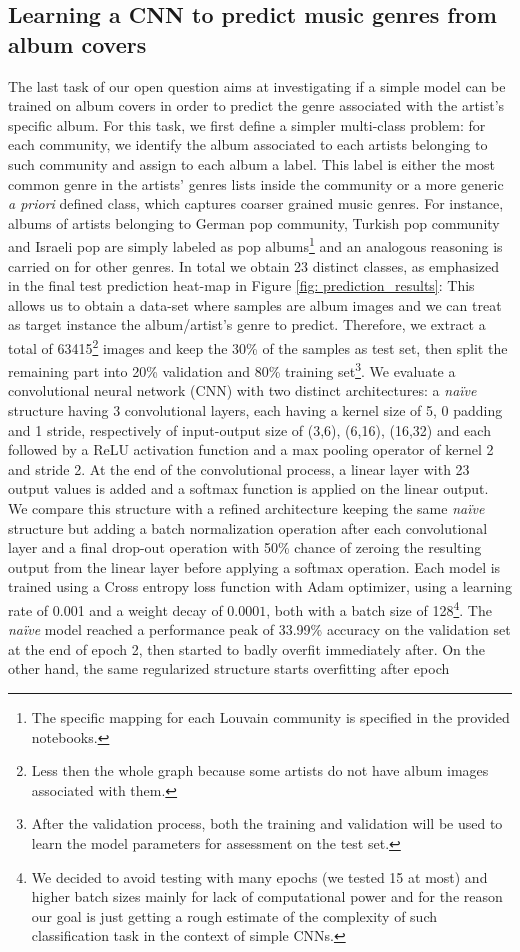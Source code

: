 \documentclass[sigchi]{acmart}
\begin{document}
\subsection{Learning a CNN to predict music genres from album covers}
The last task of our open question aims at investigating if a simple model can be trained on album covers in order to predict the genre associated with the artist's specific album. For this task, we first define a simpler multi-class problem: for each community, we identify the album associated to each artists belonging to such community and assign to each album a label. This label is either the most common genre in the artists' genres lists inside the community or a more generic \textit{a priori} defined class, which captures coarser grained music genres. For instance, albums of artists belonging to German pop community, Turkish pop community and Israeli pop are simply labeled as pop albums\footnote{The specific mapping for each Louvain community is specified in the provided notebooks.} and an analogous reasoning is carried on for other genres. In total we obtain 23 distinct classes, as emphasized in the final test prediction heat-map in Figure \ref{fig: prediction_results}: This allows us to obtain a data-set where samples are album images and we can treat as target instance the album/artist's genre to predict. Therefore, we extract a total of 63415\footnote{Less then the whole graph because some artists do not have album images associated with them.} images and keep the 30\% of the samples as test set, then split the remaining part into 20\% validation and 80\% training set\footnote{After the validation process, both the training and validation will be used to learn the model parameters for assessment on the test set.}. We evaluate a convolutional neural network (CNN) with two distinct architectures: a \textit{naïve} structure having 3 convolutional layers, each having a kernel size of 5, 0 padding and 1 stride, respectively of input-output size of (3,6), (6,16), (16,32) and each followed by a ReLU activation function and a max pooling operator of kernel 2 and stride 2. At the end of the convolutional process, a linear layer with 23 output values is added and a softmax function is applied on the linear output. We compare this structure with a refined architecture keeping the same \textit{naïve} structure but adding a batch normalization operation after each convolutional layer and a final drop-out operation with 50\% chance of zeroing the resulting output from the linear layer before applying a softmax operation. Each model is trained using a Cross entropy loss function with Adam optimizer, using a learning rate of 0.001 and a weight decay of $0.0001$, both with a batch size of 128\footnote{We decided to avoid testing with many epochs (we tested 15 at most) and higher batch sizes mainly for lack of computational power and for the reason our goal is just getting a rough estimate of the complexity of such classification task in the context of simple CNNs.}. The \textit{naïve} model reached a performance peak of 33.99\% accuracy on the validation set at the end of epoch 2, then started to badly overfit immediately after. On the other hand, the same regularized structure starts overfitting after epoch 
\end{document}
